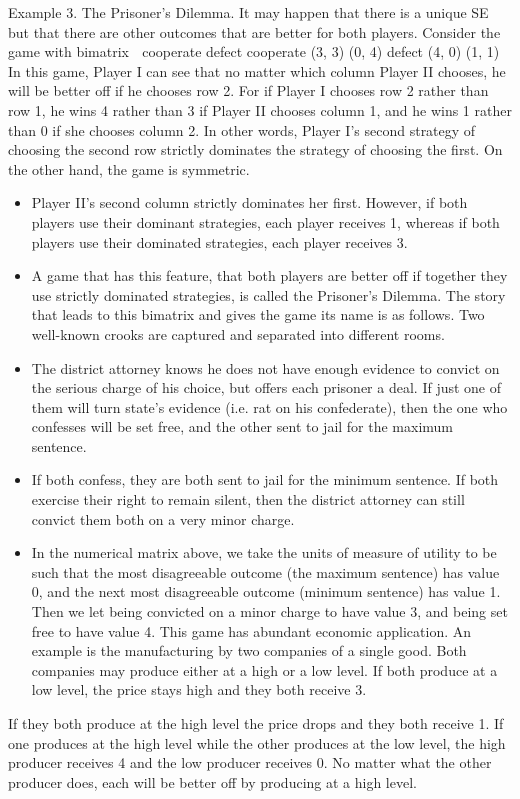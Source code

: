 \documentclass{article}
\begin{document}
Example 3. The Prisoner’s Dilemma. It may happen that there is a unique SE
but that there are other outcomes that are better for both players. Consider the game
with bimatrix

cooperate defect
cooperate (3, 3) (0, 4)
defect (4, 0) (1, 1) 
In this game, Player I can see that no matter which column Player II chooses, he will be
better off if he chooses row 2. For if Player I chooses row 2 rather than row 1, he wins
4 rather than 3 if Player II chooses column 1, and he wins 1 rather than 0 if she chooses
column 2. In other words, Player I’s second strategy of choosing the second row strictly
dominates the strategy of choosing the first. On the other hand, the game is symmetric.
\begin{itemize}
    \item Player II’s second column strictly dominates her first. However, if both players use their
dominant strategies, each player receives 1, whereas if both players use their dominated
strategies, each player receives 3.
\item A game that has this feature, that both players are better off if together they use
strictly dominated strategies, is called the Prisoner’s Dilemma. The story that leads to this
bimatrix and gives the game its name is as follows. Two well-known crooks are captured
and separated into different rooms.
\item The district attorney knows he does not have enough
evidence to convict on the serious charge of his choice, but offers each prisoner a deal. If
just one of them will turn state’s evidence (i.e. rat on his confederate), then the one who
confesses will be set free, and the other sent to jail for the maximum sentence. 
\item If both
confess, they are both sent to jail for the minimum sentence. If both exercise their right
to remain silent, then the district attorney can still convict them both on a very minor
charge.
\item In the numerical matrix above, we take the units of measure of utility to be such
that the most disagreeable outcome (the maximum sentence) has value 0, and the next
most disagreeable outcome (minimum sentence) has value 1. Then we let being convicted
on a minor charge to have value 3, and being set free to have value 4.
This game has abundant economic application. An example is the manufacturing by
two companies of a single good. Both companies may produce either at a high or a low
level. If both produce at a low level, the price stays high and they both receive 3.
\end{itemize}
 If they
both produce at the high level the price drops and they both receive 1. If one produces at
the high level while the other produces at the low level, the high producer receives 4 and
the low producer receives 0. No matter what the other producer does, each will be better
off by producing at a high level.
\end{document}
